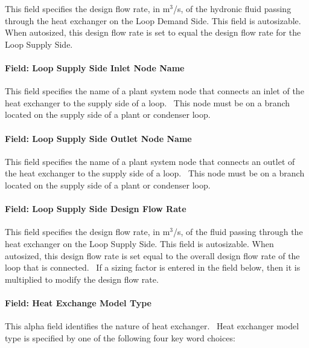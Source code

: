 This field specifies the design flow rate, in m\(^{3}\)/s, of the hydronic fluid passing through the heat exchanger on the Loop Demand Side. This field is autosizable. When autosized, this design flow rate is set to equal the design flow rate for the Loop Supply Side.

\paragraph{Field: Loop Supply Side Inlet Node Name}\label{field-loop-supply-side-inlet-node-name}

This field specifies the name of a plant system node that connects an inlet of the heat exchanger to the supply side of a loop.~ This node must be on a branch located on the supply side of a plant or condenser loop.

\paragraph{Field: Loop Supply Side Outlet Node Name}\label{field-loop-supply-side-outlet-node-name}

This field specifies the name of a plant system node that connects an outlet of the heat exchanger to the supply side of a loop.~ This node must be on a branch located on the supply side of a plant or condenser loop.

\paragraph{Field: Loop Supply Side Design Flow Rate}\label{field-loop-supply-side-design-flow-rate}

This field specifies the design flow rate, in m\(^{3}\)/s, of the fluid passing through the heat exchanger on the Loop Supply Side. This field is autosizable. When autosized, this design flow rate is set equal to the overall design flow rate of the loop that is connected.~ If a sizing factor is entered in the field below, then it is multiplied to modify the design flow rate.

\paragraph{Field: Heat Exchange Model Type}\label{field-heat-exchange-model-type}

This alpha field identifies the nature of heat exchanger.~ Heat exchanger model type is specified by one of the following four key word choices:

